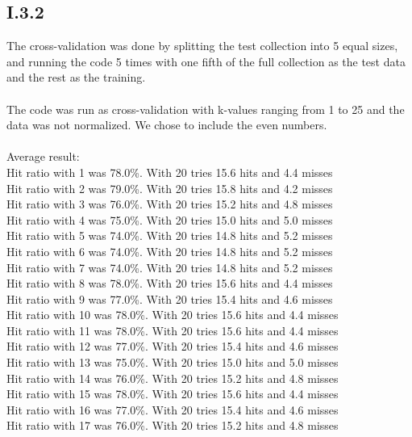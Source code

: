 \documentclass{article}
\begin{document}
\subsection{I.3.2}

The cross-validation was done by splitting the test collection into
5 equal sizes, and running the code 5 times with one fifth of the full
collection as the test data and the rest as the training.\\\\ The code
was run as cross-validation with k-values ranging from 1 to 25 and the
data was not normalized. We chose to include the even numbers.\\\\
Average result:\\ 
Hit ratio with 1 was   78.0\%. With 20 tries 15.6 hits and 4.4 misses\\
Hit ratio with 2 was   79.0\%. With 20 tries 15.8 hits and 4.2 misses\\
Hit ratio with 3 was   76.0\%. With 20 tries 15.2 hits and 4.8 misses\\
Hit ratio with 4 was   75.0\%. With 20 tries 15.0 hits and 5.0 misses\\
Hit ratio with 5 was   74.0\%. With 20 tries 14.8 hits and 5.2 misses\\
Hit ratio with 6 was   74.0\%. With 20 tries 14.8 hits and 5.2 misses\\
Hit ratio with 7 was   74.0\%. With 20 tries 14.8 hits and 5.2 misses\\
Hit ratio with 8 was   78.0\%. With 20 tries 15.6 hits and 4.4 misses\\
Hit ratio with 9 was   77.0\%. With 20 tries 15.4 hits and 4.6 misses\\
Hit ratio with 10 was  78.0\%. With 20 tries 15.6 hits and 4.4 misses\\
Hit ratio with 11 was  78.0\%. With 20 tries 15.6 hits and 4.4 misses\\
Hit ratio with 12 was  77.0\%. With 20 tries 15.4 hits and 4.6 misses\\
Hit ratio with 13 was  75.0\%. With 20 tries 15.0 hits and 5.0 misses\\
Hit ratio with 14 was  76.0\%. With 20 tries 15.2 hits and 4.8 misses\\
Hit ratio with 15 was  78.0\%. With 20 tries 15.6 hits and 4.4 misses\\
Hit ratio with 16 was  77.0\%. With 20 tries 15.4 hits and 4.6 misses\\
Hit ratio with 17 was  76.0\%. With 20 tries 15.2 hits and 4.8 misses\\
\end{document}

